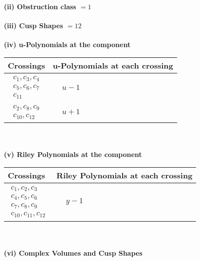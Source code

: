 \documentclass[1p]{elsarticle_modified}
\theoremstyle{definition}
\begin{document}
\flushleft \textbf{(ii) Obstruction class $= 1$}\\~\\
\flushleft \textbf{(iii) Cusp Shapes $= 12$}\\~\\
\newpage\renewcommand{\arraystretch}{1}
\flushleft \textbf{(iv) u-Polynomials at the component}\newline \\
\begin{tabular}{m{50pt}|m{274pt}}
Crossings & \hspace{64pt}u-Polynomials at each crossing \\
\hline $$\begin{aligned}c_{1},c_{3},c_{4}\\c_{5},c_{6},c_{7}\\c_{11}\end{aligned}$$&$\begin{aligned}
&u-1
\end{aligned}$\\
\hline $$\begin{aligned}c_{2},c_{8},c_{9}\\c_{10},c_{12}\end{aligned}$$&$\begin{aligned}
&u+1
\end{aligned}$\\
\hline
\end{tabular}\\~\\
\newpage\renewcommand{\arraystretch}{1}
\flushleft \textbf{(v) Riley Polynomials at the component}\newline \\
\begin{tabular}{m{50pt}|m{274pt}}
Crossings & \hspace{64pt}Riley Polynomials at each crossing \\
\hline $$\begin{aligned}c_{1},c_{2},c_{3}\\c_{4},c_{5},c_{6}\\c_{7},c_{8},c_{9}\\c_{10},c_{11},c_{12}\end{aligned}$$&$\begin{aligned}
&y-1
\end{aligned}$\\
\hline
\end{tabular}\\~\\
\newpage\flushleft \textbf{(vi) Complex Volumes and Cusp Shapes}
\end{document}
